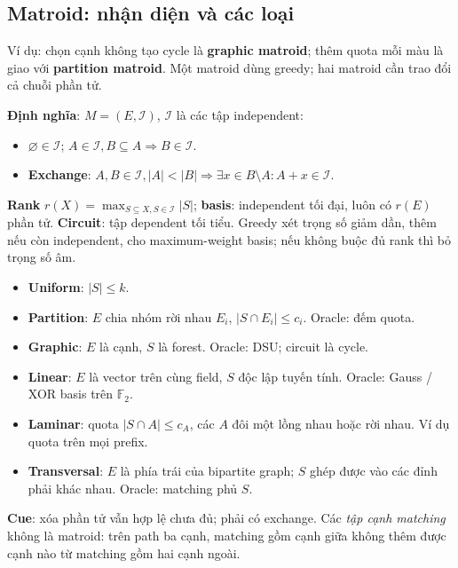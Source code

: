 \subsection{Matroid: nhận diện và các loại}
Ví dụ: chọn cạnh không tạo cycle là \textbf{graphic matroid}; thêm quota mỗi màu là giao với \textbf{partition matroid}. Một matroid dùng greedy; hai matroid cần trao đổi cả chuỗi phần tử.

\textbf{Định nghĩa}: $M=(E,\mathcal I)$, $\mathcal I$ là các tập independent:
\begin{itemize}
    \item $\varnothing\in\mathcal I$; $A\in\mathcal I, B\subseteq A\Rightarrow B\in\mathcal I$.
    \item \textbf{Exchange}: $A,B\in\mathcal I, |A|<|B|\Rightarrow\exists x\in B\setminus A: A+x\in\mathcal I$.
\end{itemize}
\textbf{Rank} $r(X)=\max_{S\subseteq X,S\in\mathcal I}|S|$; \textbf{basis}: independent tối đại, luôn có $r(E)$ phần tử. \textbf{Circuit}: tập dependent tối tiểu. Greedy xét trọng số giảm dần, thêm nếu còn independent, cho maximum-weight basis; nếu không buộc đủ rank thì bỏ trọng số âm.

\begin{itemize}
    \item \textbf{Uniform}: $|S|\le k$.
    \item \textbf{Partition}: $E$ chia nhóm rời nhau $E_i$, $|S\cap E_i|\le c_i$. Oracle: đếm quota.
    \item \textbf{Graphic}: $E$ là cạnh, $S$ là forest. Oracle: DSU; circuit là cycle.
    \item \textbf{Linear}: $E$ là vector trên cùng field, $S$ độc lập tuyến tính. Oracle: Gauss / XOR basis trên $\mathbb F_2$.
    \item \textbf{Laminar}: quota $|S\cap A|\le c_A$, các $A$ đôi một lồng nhau hoặc rời nhau. Ví dụ quota trên mọi prefix.
    \item \textbf{Transversal}: $E$ là phía trái của bipartite graph; $S$ ghép được vào các đỉnh phải khác nhau. Oracle: matching phủ $S$.
\end{itemize}
\textbf{Cue}: xóa phần tử vẫn hợp lệ chưa đủ; phải có exchange. Các \emph{tập cạnh matching} không là matroid: trên path ba cạnh, matching gồm cạnh giữa không thêm được cạnh nào từ matching gồm hai cạnh ngoài.

